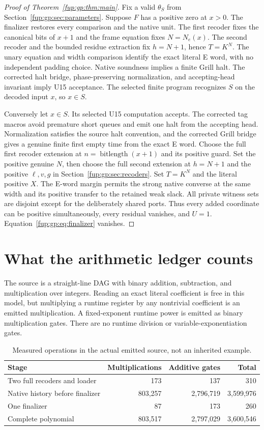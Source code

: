 \documentclass[11pt,letterpaper]{article}
\theoremstyle{definition}\newtheorem{definition}[theorem]{Definition}
\theoremstyle{remark}\newtheorem{remark}[theorem]{Remark}
\newcommand{\bits}{\operatorname{bitlength}}
\begin{document}
\begin{proof}[Proof of Theorem~\ref{fup:gp:thm:main}]
Fix a valid $\theta_S$ from Section~\ref{fup:gp:sec:parameters}. Suppose $F$ has a positive zero at $x>0$. The finalizer restores every comparison and the native unit. The first recoder fixes the canonical bits of $x+1$ and the frame equation fixes $N=N_e(x)$. The second recoder and the bounded residue extraction fix $h=N+1$, hence $T=K^N$. The unary equation and width comparison identify the exact literal E word, with no independent padding choice. Native soundness implies a finite Grill halt. The corrected halt bridge, phase-preserving normalization, and accepting-head invariant imply U15 acceptance. The selected finite program recognizes $S$ on the decoded input $x$, so $x\in S$.

Conversely let $x\in S$. Its selected U15 computation accepts. The corrected tag macros avoid premature short queues and emit one halt from the accepting head. Normalization satisfies the source halt convention, and the corrected Grill bridge gives a genuine finite first empty time from the exact E word. Choose the full first recoder extension at $n=\bits(x+1)$ and its positive guard. Set the positive genuine $N$, then choose the full second extension at $h=N+1$ and the positive $\ell,v,g$ in Section~\ref{fup:gp:sec:recoders}. Set $T=K^N$ and the literal positive $X$. The E-word margin permits the strong native converse at the same width and its positive transfer to the retained weak slack. All private witness sets are disjoint except for the deliberately shared ports. Thus every added coordinate can be positive simultaneously, every residual vanishes, and $U=1$. Equation~\eqref{fup:gp:eq:finalizer} vanishes.
\end{proof}

\section{What the arithmetic ledger counts}\label{fup:gp:sec:cost}
The source is a straight-line DAG with binary addition, subtraction, and multiplication over integers. Reading an exact literal coefficient is free in this model, but multiplying a runtime register by any nontrivial coefficient is an emitted multiplication. A fixed-exponent runtime power is emitted as binary multiplication gates. There are no runtime division or variable-exponentiation gates.

\begin{table}[ht]
\centering
\small
\begin{tabular}{lrrr}
\toprule
Stage & Multiplications & Additive gates & Total\\\midrule
Two full recoders and loader & 173 & 137 & 310\\
Native history before finalizer & 803,257 & 2,796,719 & 3,599,976\\
One finalizer & 87 & 173 & 260\\\midrule
Complete polynomial & 803,517 & 2,797,029 & 3,600,546\\\bottomrule
\end{tabular}
\caption{Measured operations in the actual emitted source, not an inherited example.}
\end{table}
\end{document}
